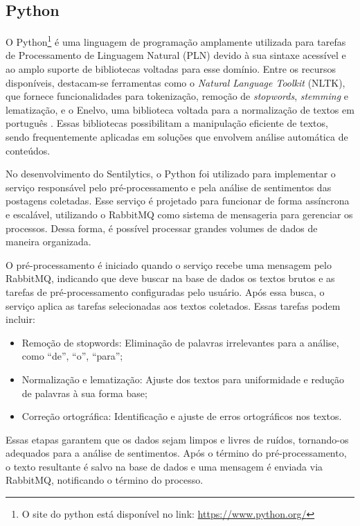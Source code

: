 \documentclass[
	12pt,				%
	oneside,			%
	a4paper,			%
	english,			%
	french,				%
	spanish,			%
	brazil				%
	]{abntex2}
\begin{document}
\hypertarget{python}{%
\subsection{Python}\label{python}}

O Python\footnote{O site do python está disponível no link:
  \url{https://www.python.org/}} é uma linguagem de programação
amplamente utilizada para tarefas de Processamento de Linguagem Natural
(PLN) devido à sua sintaxe acessível e ao amplo suporte de bibliotecas
voltadas para esse domínio. Entre os recursos disponíveis, destacam-se
ferramentas como o \emph{Natural Language Toolkit} (NLTK), que fornece
funcionalidades para tokenização, remoção de \emph{stopwords},
\emph{stemming} e lematização, e o Enelvo, uma biblioteca voltada para a
normalização de textos em português \cite{bertaglia2016exploring}. Essas
bibliotecas possibilitam a manipulação eficiente de textos, sendo
frequentemente aplicadas em soluções que envolvem análise automática de
conteúdos.

No desenvolvimento do Sentilytics, o Python foi utilizado para
implementar o serviço responsável pelo pré-processamento e pela análise
de sentimentos das postagens coletadas. Esse serviço é projetado para
funcionar de forma assíncrona e escalável, utilizando o RabbitMQ como
sistema de mensageria para gerenciar os processos. Dessa forma, é
possível processar grandes volumes de dados de maneira organizada.

O pré-processamento é iniciado quando o serviço recebe uma mensagem pelo
RabbitMQ, indicando que deve buscar na base de dados os textos brutos e
as tarefas de pré-processamento configuradas pelo usuário. Após essa
busca, o serviço aplica as tarefas selecionadas aos textos coletados.
Essas tarefas podem incluir:

\begin{itemize}
\tightlist
\item
  Remoção de stopwords: Eliminação de palavras irrelevantes para a
  análise, como ``de'', ``o'', ``para'';
\item
  Normalização e lematização: Ajuste dos textos para uniformidade e
  redução de palavras à sua forma base;
\item
  Correção ortográfica: Identificação e ajuste de erros ortográficos nos
  textos.
\end{itemize}

Essas etapas garantem que os dados sejam limpos e livres de ruídos,
tornando-os adequados para a análise de sentimentos. Após o término do
pré-processamento, o texto resultante é salvo na base de dados e uma
mensagem é enviada via RabbitMQ, notificando o término do processo.
\end{document}
